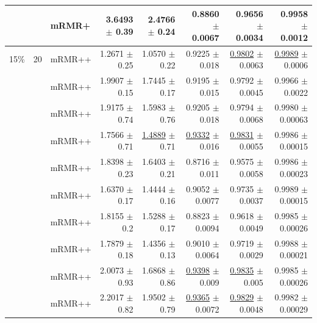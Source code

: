 \begin{longtable}{llp{}rrrrr}
 &  & mRMR+ & 3.6493 {\scriptsize $\pm$ 0.39} & 2.4766 {\scriptsize $\pm$ 0.24} & 0.8860 {\scriptsize $\pm$ 0.0067} & 0.9656 {\scriptsize $\pm$ 0.0034} & 0.9958 {\scriptsize $\pm$ 0.0012} \\
\midrule
15\% & 20 & mRMR++ & 1.2671 {\scriptsize $\pm$ 0.25} & 1.0570 {\scriptsize $\pm$ 0.22} & 0.9225 {\scriptsize $\pm$ 0.018} & \underline{0.9802} {\scriptsize $\pm$ 0.0063} & \underline{0.9989} {\scriptsize $\pm$ 0.0006} \\
 &  & mRMR++ & 1.9907 {\scriptsize $\pm$ 0.15} & 1.7445 {\scriptsize $\pm$ 0.17} & 0.9195 {\scriptsize $\pm$ 0.015} & 0.9792 {\scriptsize $\pm$ 0.0045} & 0.9966 {\scriptsize $\pm$ 0.0022} \\
 &  & mRMR++ & 1.9175 {\scriptsize $\pm$ 0.74} & 1.5983 {\scriptsize $\pm$ 0.76} & 0.9205 {\scriptsize $\pm$ 0.018} & 0.9794 {\scriptsize $\pm$ 0.0068} & 0.9980 {\scriptsize $\pm$ 0.00063} \\
 &  & mRMR++ & 1.7566 {\scriptsize $\pm$ 0.71} & \underline{1.4889} {\scriptsize $\pm$ 0.71} & \underline{0.9332} {\scriptsize $\pm$ 0.016} & \underline{0.9831} {\scriptsize $\pm$ 0.0055} & 0.9986 {\scriptsize $\pm$ 0.00015} \\
 &  & mRMR++ & 1.8398 {\scriptsize $\pm$ 0.23} & 1.6403 {\scriptsize $\pm$ 0.21} & 0.8716 {\scriptsize $\pm$ 0.011} & 0.9575 {\scriptsize $\pm$ 0.0058} & 0.9986 {\scriptsize $\pm$ 0.00023} \\
 &  & mRMR++ & 1.6370 {\scriptsize $\pm$ 0.17} & 1.4444 {\scriptsize $\pm$ 0.16} & 0.9052 {\scriptsize $\pm$ 0.0077} & 0.9735 {\scriptsize $\pm$ 0.0037} & 0.9989 {\scriptsize $\pm$ 0.00015} \\
 &  & mRMR++ & 1.8155 {\scriptsize $\pm$ 0.2} & 1.5288 {\scriptsize $\pm$ 0.17} & 0.8823 {\scriptsize $\pm$ 0.0094} & 0.9618 {\scriptsize $\pm$ 0.0049} & 0.9985 {\scriptsize $\pm$ 0.00026} \\
 &  & mRMR++ & 1.7879 {\scriptsize $\pm$ 0.18} & 1.4356 {\scriptsize $\pm$ 0.13} & 0.9010 {\scriptsize $\pm$ 0.0064} & 0.9719 {\scriptsize $\pm$ 0.0029} & 0.9988 {\scriptsize $\pm$ 0.00021} \\
 &  & mRMR++ & 2.0073 {\scriptsize $\pm$ 0.93} & 1.6868 {\scriptsize $\pm$ 0.86} & \underline{0.9398} {\scriptsize $\pm$ 0.009} & \underline{0.9835} {\scriptsize $\pm$ 0.005} & 0.9985 {\scriptsize $\pm$ 0.00026} \\
 &  & mRMR++ & 2.2017 {\scriptsize $\pm$ 0.82} & 1.9502 {\scriptsize $\pm$ 0.79} & \underline{0.9365} {\scriptsize $\pm$ 0.0072} & \underline{0.9829} {\scriptsize $\pm$ 0.0048} & 0.9982 {\scriptsize $\pm$ 0.00029} \\

\end{longtable}
